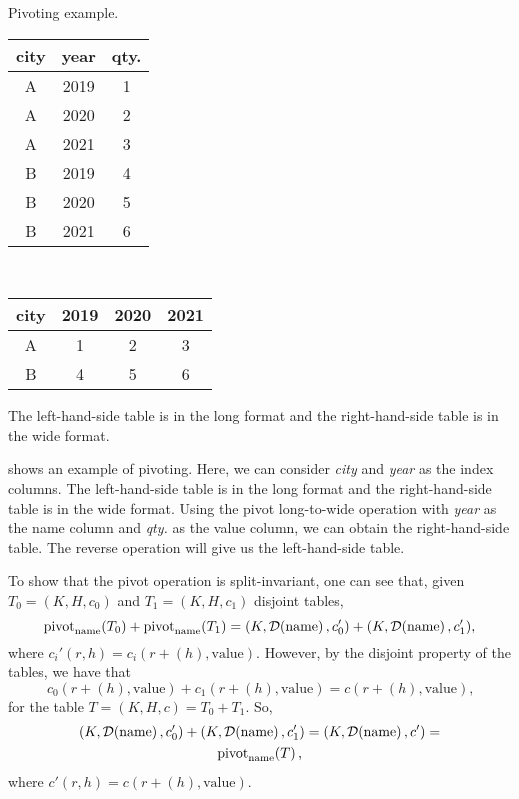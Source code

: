 \begin{tablebox}[label=tab:pivot]{Pivoting example.}
    \centering
    \begin{tabular}{ccc}
      \toprule
      \textbf{city} & \textbf{year} & \textbf{qty.} \\
      \midrule
      A & 2019 & 1 \\
      A & 2020 & 2 \\
      A & 2021 & 3 \\
      B & 2019 & 4 \\
      B & 2020 & 5 \\
      B & 2021 & 6 \\
      \bottomrule
    \end{tabular}
    ~
    \begin{tabular}{cccc}
      \toprule
      \textbf{city} & \textbf{2019} & \textbf{2020} & \textbf{2021} \\
      \midrule
      A & 1 & 2 & 3 \\
      B & 4 & 5 & 6 \\
      \bottomrule
    \end{tabular}
  \tcblower
  The left-hand-side table is in the long format and the right-hand-side table is in the
  wide format.
\end{tablebox}

 shows an example of pivoting.  Here, we can consider \emph{city} and
\emph{year} as the index columns.  The left-hand-side table is in the long format and the
right-hand-side table is in the wide format.  Using the pivot long-to-wide operation with
\emph{year} as the name column and \emph{qty.} as the value column, we can obtain the
right-hand-side table.  The reverse operation will give us the left-hand-side table.

To show that the pivot operation is split-invariant, one can see that, given
$T_0 = (K, H, c_0)$ and $T_1 = (K, H, c_1)$ disjoint tables,
\[
  \operatorname{pivot}_\text{name}\!\left(T_0\right) + \operatorname{pivot}_\text{name}\!\left(T_1\right) = \\
    (K, \mathcal{D}\!\left(\text{name}\right), c_0') + (K, \mathcal{D}\!\left(\text{name}\right), c_1')\text{,}
\] where $c_i'(r, h) = c_i(r + (h), \text{value})$.  However, by the disjoint property of
the tables, we have that \[
  c_0(r + (h), \text{value}) + c_1(r + (h), \text{value}) = c(r + (h), \text{value})\text{,}
\] for the table $T = (K, H, c) = T_0 + T_1$. So,
\begin{multline*}
  (K, \mathcal{D}\!\left(\text{name}\right), c_0') + (K, \mathcal{D}\!\left(\text{name}\right), c_1') =
    (K, \mathcal{D}\!\left(\text{name}\right), c') =\\
    \operatorname{pivot}_\text{name}\!\left(T\right)\text{,}
\end{multline*}
where $c'(r, h) = c(r + (h), \text{value})$.

